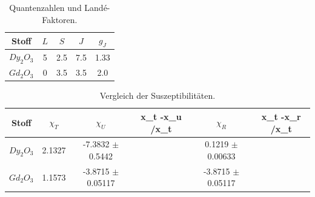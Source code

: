 \begin{table}
  \centering
  \caption{Quantenzahlen und Landé-Faktoren.}
  \begin{tabular}{c c c c c }
    \toprule
    {Stoff} & {$L$} & {$S$} & {$J$} & {$g_J$}\\
    \midrule
    $Dy_2O_3$ & 5 & 2.5 & 7.5 & 1.33\\
    $Gd_2O_3$ & 0 & 3.5 & 3.5 & 2.0\\
    \bottomrule
  \end{tabular}
\end{table}

\begin{table}
  \centering
  \caption{Vergleich der Suszeptibilitäten.}
  \begin{tabular}{c c c c c c}
    \toprule
    {Stoff} & {$\chi_T$} &{$\chi_U$} & {x_t -x_u /x_t} & {$\chi_R$} & {x_t -x_r /x_t}\\
    \midrule
    $Dy_2O_3$ & 2.1327 & -7.3832 $\pm$ 0.5442 &  &0.1219 $\pm$ 0.00633 &  \\
    $Gd_2O_3$ & 1.1573 & -3.8715 $\pm$ 0.05117 &  &-3.8715 $\pm$ 0.05117 &  \\
    \bottomrule
  \end{tabular}
\end{table}